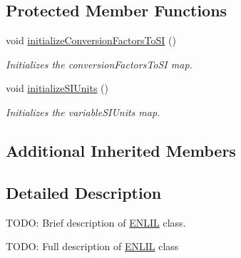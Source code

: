 \subsection*{Protected Member Functions}
\begin{DoxyCompactItemize}
\item 
void \hyperlink{classccmc_1_1_e_n_l_i_l_afff7548cddd78a77eaa0322a45415ab6}{initialize\-Conversion\-Factors\-To\-S\-I} ()
\begin{DoxyCompactList}\small\item\em Initializes the conversion\-Factors\-To\-S\-I map.  \end{DoxyCompactList}\item 
void \hyperlink{classccmc_1_1_e_n_l_i_l_aa4d5d805912f4abfdd65083424ebb000}{initialize\-S\-I\-Units} ()
\begin{DoxyCompactList}\small\item\em Initializes the variable\-S\-I\-Units map.  \end{DoxyCompactList}\end{DoxyCompactItemize}
\subsection*{Additional Inherited Members}


\subsection{Detailed Description}
T\-O\-D\-O\-: Brief description of \hyperlink{classccmc_1_1_e_n_l_i_l}{E\-N\-L\-I\-L} class. 

T\-O\-D\-O\-: Full description of \hyperlink{classccmc_1_1_e_n_l_i_l}{E\-N\-L\-I\-L} class 

